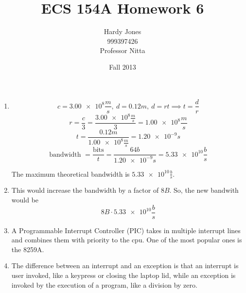 \documentclass[12pt,letterpaper]{article}
\title{ECS 154A Homework 6\vspace{-2ex}}
\author{Hardy Jones\\
        999397426\\
        Professor Nitta\vspace{-2ex}}
\date{Fall 2013}
\begin{document}
  \maketitle

  \begin{enumerate}
    \item
      \[c = \num{3.00e8}\frac{m}{s}, \ d = 0.12m, \ d = rt \implies t = \frac{d}{r}\]
      \[r = \frac{c}{3} = \frac{\num{3.00e8}\frac{m}{s}}{3} = \num{1.00e8}\frac{m}{s}\]
      \[t = \frac{0.12m}{\num{1.00e8}\frac{m}{s}} = \num{1.20e-9}s\]
      \[\text{bandwidth } = \frac{\text{bits}}{t} = \frac{64b}{\num{1.20e-9}s} = \num{5.33e10}\frac{b}{s}\]

      The maximum theoretical bandwidth is $\num{5.33e10}\frac{b}{s}$.

    \item
      This would increase the bandwidth by a factor of $8B$.
      So, the new bandwith would be \[8B \cdot \num{5.33e10}\frac{b}{s}\]

    \item
      A Programmable Interrupt Controller (PIC) takes in multiple interrupt lines and combines them with priority to the cpu.
      One of the most popular ones is the 8259A.

    \item
      The difference between an interrupt and an exception is that
      an interrupt is user invoked, like a keypress or closing the laptop lid,
      while an exception is invoked by the execution of a program, like a division by zero.
  \end{enumerate}
\end{document}
